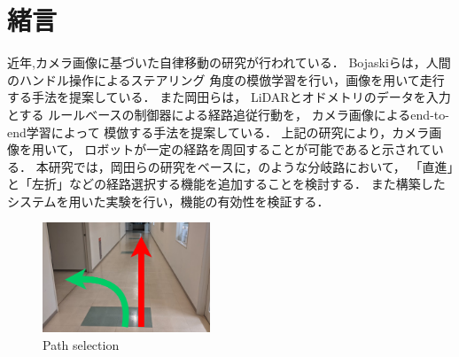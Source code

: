 \documentclass[10pt]{jarticle}
\begin{document}
    \section{緒\hspace{2zw}言}%
    近年,カメラ画像に基づいた自律移動の研究が行われている．%
    Bojaskiら\cite{nvidia}は，人間のハンドル操作によるステアリング
    角度の模倣学習を行い，画像を用いて走行する手法を提案している．
    また岡田ら\cite{okada}は，
    LiDARとオドメトリのデータを入力とする
    ルールべースの制御器による経路追従行動を，
    カメラ画像によるend-to-end学習によって
    模倣する手法を提案している．
    上記の研究により，カメラ画像を用いて，
    ロボットが一定の経路を周回することが可能であると示されている．
    本研究では，岡田らの研究をベースに，のような分岐路において，
    「直進」と「左折」などの経路選択する機能を追加することを検討する．
    また構築したシステムを用いた実験を行い，機能の有効性を検証する．

    \begin{center}
        \begin{figure}[h]
            \centering
            \includegraphics[width=5cm]{./fig/zyuzibunki.png}
            \caption{Path selection}
            \label{fig:bunki}
        \end{figure}
    \end{center}
\end{document}
